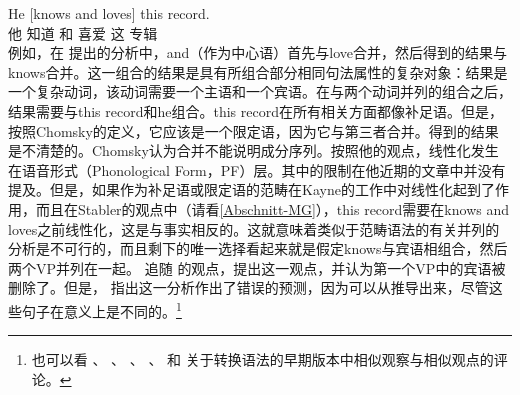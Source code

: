 
\ea
\label{ex-he-knows-and-loves-this-record-MP}
\gll He [knows and loves] this record.\\
     他 \spacebr{}知道 和 喜爱 这 专辑\\
\z
例如，在 \citet[]{Steedman91a}提出的分析中，and（作为中心语）首先与love合并，然后得到的结果与knows合并。这一组合的结果是具有所组合部分相同句法属性的复杂对象：结果是一个复杂动词，该动词需要一个主语和一个宾语。在与两个动词并列的组合之后，结果需要与this record和he组合。this record在所有相关方面都像补足语。但是，按照Chomsky的定义，它应该是一个限定语，因为它与第三者合并。得到的结果是不清楚的。Chomsky认为合并不能说明成分序列。按照他的观点，线性化发生在语音形式（Phonological
    Form，PF）层。其中的限制在他近期的文章中并没有提及。但是，如果作为补足语或限定语的范畴在Kayne的工作中对线性化起到了作用，而且在Stabler的观点中（请看\ref{Abschnitt-MG}），this record需要在knows and loves之前线性化，这是与事实相反的。这就意味着类似于范畴语法的有关并列的分析是不可行的，而且剩下的唯一选择看起来就是假定knows与宾语相组合，然后两个VP并列在一起。 \citet[, 67]{Kayne94a-u}追随 \citet[]{WC80a-u}的观点，提出这一观点，并认为第一个VP中的宾语被删除了。但是， \citet[]{Borsley2005a}指出这一分析作出了错误的预测，因为可以从推导出来，尽管这些句子在意义上是不同的。\footnote{%
也可以看 、 、 、 、 和 关于转换语法的早期版本中相似观察与相似观点的评论。
}
